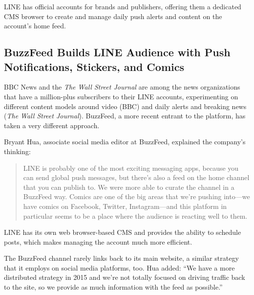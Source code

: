 \documentclass[notoc, symmetric, nobib, nols]{towcenter-guideto-book}
\begin{document}
LINE has official accounts for brands and publishers, offering them a dedicated CMS browser to create and manage daily push alerts and content on the account's home feed.

\subsection{BuzzFeed Builds LINE Audience with Push Notifications, Stickers, and Comics}

BBC News and the \textit{The Wall Street Journal} are among the news organizations that have a million-plus subscribers to their LINE accounts, experimenting on different content models around video (BBC) and daily alerts and breaking news (\textit{The Wall Street Journal}). BuzzFeed, a more recent entrant to the platform, has taken a very different approach.

Bryant Hua, associate social media editor at BuzzFeed, explained the company's thinking:

\begin{quote}
LINE is probably one of the most exciting messaging apps, because you can send global push messages, but there's also a feed on the home channel that you can publish to. We were more able to curate the channel in a BuzzFeed way. Comics are one of the big areas that we're pushing into---we have comics on Facebook, Twitter, Instagram---and this platform in particular seems to be a place where the audience is reacting well to them.
\end{quote}




LINE has its own web browser-based CMS and provides the ability to schedule posts, which makes managing the account much more efficient.

The BuzzFeed channel rarely links back to its main website, a similar strategy that it employs on social media platforms, too. Hua added: ``We have a more distributed strategy in 2015 and we're not totally focused on driving traffic back to the site, so we provide as much information with the feed as possible.'' 
\end{document}
